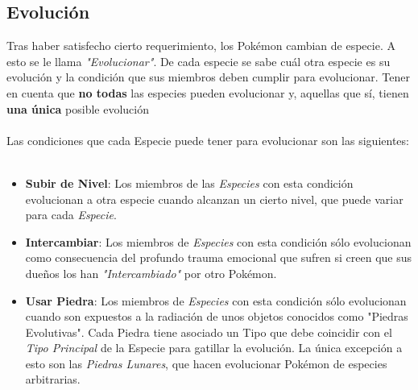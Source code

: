 \documentclass[spanish,a4paper]{article}
\begin{document}
\subsection{Evolución}

Tras haber satisfecho cierto requerimiento, los Pokémon cambian de especie. 
A esto se le llama \textit{"Evolucionar"}. De cada especie se sabe cuál otra especie es su evolución y la condición que sus miembros deben cumplir para evolucionar. 
Tener en cuenta que \textbf{no todas} las especies pueden evolucionar y, aquellas que sí, tienen \textbf{una única} posible evolución
\\\\
Las condiciones que cada Especie puede tener para evolucionar son las siguientes:
\\\\

\begin{itemize}
\item \textbf{Subir de Nivel}: Los miembros de las \textit{Especies} con esta condición evolucionan a otra especie cuando alcanzan un cierto nivel, que puede variar para cada \textit{Especie}.
\item \textbf{Intercambiar}: Los miembros de \textit{Especies} con esta condición sólo evolucionan como consecuencia del profundo trauma emocional que sufren si creen que sus dueños los han \textit{"Intercambiado"} por otro Pokémon.
\item \textbf{Usar Piedra}: Los miembros de \textit{Especies} con esta condición sólo evolucionan cuando son expuestos a la radiación de unos objetos conocidos como "Piedras Evolutivas". 
Cada Piedra tiene asociado un Tipo que debe coincidir con el \textit{Tipo Principal} de la Especie para gatillar la evolución. La única excepción a esto son las \textit{Piedras Lunares}, que hacen evolucionar Pokémon de especies arbitrarias.
\end{itemize}

\end{document}
